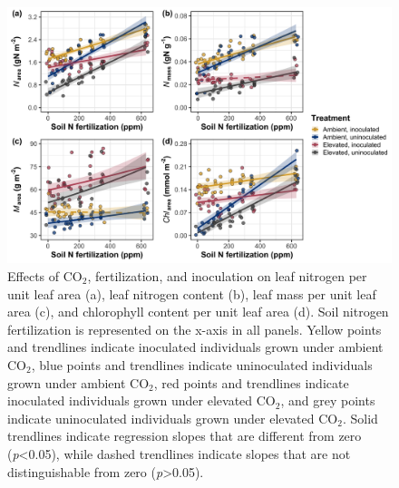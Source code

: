 \newpage
\begin{landscape}
    \begin{figure}
        \centering
        \includegraphics[scale = 0.0625]{ch5_NxCO2xI/figs/NxCO2xI_fig1_leafN.png}
        \caption[Effects of CO$_2$, fertilization, and inoculation on leaf nitrogen per unit leaf area, leaf nitrogen content, leaf mass per unit leaf area, and chlorophyll content per unit leaf area]{Effects of CO$_2$, fertilization, and inoculation on leaf nitrogen per unit leaf area (a), leaf nitrogen content (b), leaf mass per unit leaf area (c), and chlorophyll content per unit leaf area (d). Soil nitrogen fertilization is represented on the x-axis in all panels. Yellow points and trendlines indicate inoculated individuals grown under ambient CO$_2$, blue points and trendlines indicate uninoculated individuals grown under ambient CO$_2$, red points and trendlines indicate inoculated individuals grown under elevated CO$_2$, and grey points indicate uninoculated individuals grown under elevated CO$_2$. Solid trendlines indicate regression slopes that are different from zero (\textit{p}<0.05), while dashed trendlines indicate slopes that are not distinguishable from zero (\textit{p}>0.05).}
        \label{fig:figure5.1}
    \end{figure}
\end{landscape}
\clearpage

